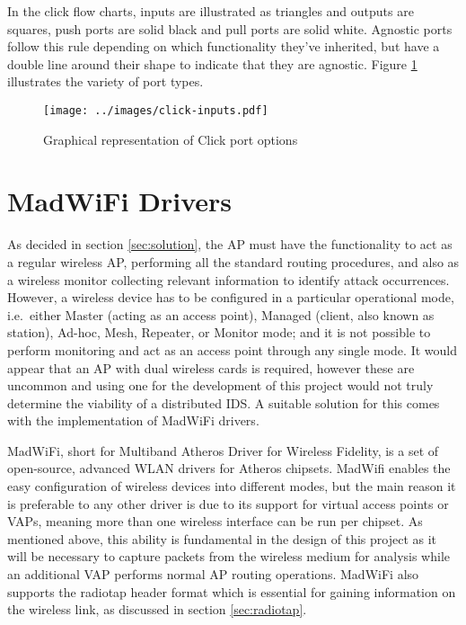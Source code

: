     In the click flow charts, inputs are illustrated as triangles and outputs are squares, push ports are solid black and pull ports are solid white. Agnostic ports follow this rule depending on which functionality they've inherited, but have a double line around their shape to indicate that they are agnostic. Figure \ref{fig:click-inputs} illustrates the variety of port types.\\


    \begin{figure}[ht!]
    \centering
    \texttt{[image: ../images/click-inputs.pdf]}
    \caption{Graphical representation of Click port options}
    \label{fig:click-inputs}
    \end{figure}

  \section{MadWiFi Drivers}
    \label{sec:madwifi}
    As decided in section \ref{sec:solution}, the AP must have the functionality to act as a regular wireless AP, performing all the standard routing procedures, and also as a wireless monitor collecting relevant information to identify attack occurrences. However, a wireless device has to be configured in a particular operational mode, i.e.\ either Master (acting as an access point), Managed (client, also known as station), Ad-hoc, Mesh, Repeater, or Monitor mode; and it is not possible to perform monitoring and act as an access point through any single mode. It would appear that an AP with dual wireless cards is required, however these are uncommon and using one for the development of this project would not truly determine the viability of a distributed IDS. A suitable solution for this comes with the implementation of MadWiFi drivers.

    MadWiFi, short for Multiband Atheros Driver for Wireless Fidelity, is a set of open-source, advanced WLAN drivers for Atheros chipsets. MadWifi enables the easy configuration of wireless devices into different modes, but the main reason it is preferable to any other driver is due to its support for virtual access points or VAPs, meaning more than one wireless interface can be run per chipset. As mentioned above, this ability is fundamental in the design of this project as it will be necessary to capture packets from the wireless medium for analysis while an additional VAP performs normal AP routing operations. MadWiFi also supports the radiotap header format which is essential for gaining information on the wireless link, as discussed in section \ref{sec:radiotap}.

